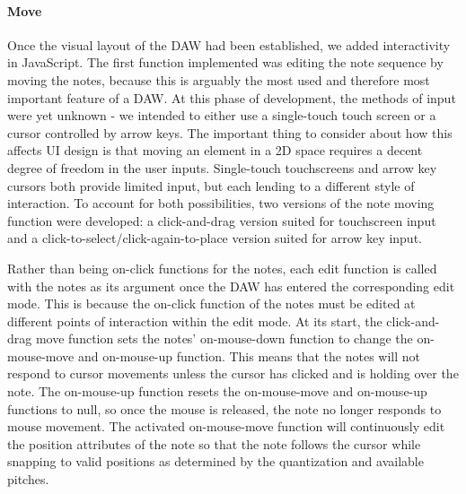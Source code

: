 \paragraph{Move}

Once the visual layout of the DAW had been established, we added interactivity in JavaScript. The
first function implemented was editing the note sequence by moving the notes, because this is
arguably the most used and therefore most important feature of a DAW. At this phase of development,
the methods of input were yet unknown - we intended to either use a single-touch touch screen or a
cursor controlled by arrow keys. The important thing to consider about how this affects UI design
is that moving an element in a 2D space requires a decent degree of freedom in the user inputs.
Single-touch touchscreens and arrow key cursors both provide limited input, but each lending to a
different style of interaction. To account for both possibilities, two versions of the note moving
function were developed: a click-and-drag version suited for touchscreen input and a
click-to-select/click-again-to-place version suited for arrow key input.

Rather than being on-click functions for the notes, each edit function is called with the notes as
its argument once the DAW has entered the corresponding edit mode. This is because the on-click
function of the notes must be edited at different points of interaction within the edit mode. At
its start, the click-and-drag move function sets the notes' on-mouse-down function to change the
on-mouse-move and on-mouse-up function. This means that the notes will not respond to cursor
movements unless the cursor has clicked and is holding over the note. The on-mouse-up function
resets the on-mouse-move and on-mouse-up functions to null, so once the mouse is released, the note
no longer responds to mouse movement. The activated on-mouse-move function will continuously edit
the position attributes of the note so that the note follows the cursor while snapping to valid
positions as determined by the quantization and available pitches.


